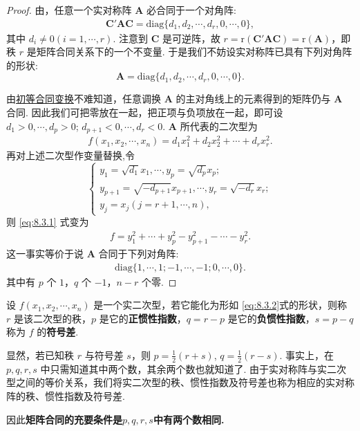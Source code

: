 \documentclass[../../main.tex]{subfiles}%
\begin{document}
\begin{proof}
由，任意一个实对称阵 $\boldsymbol{A}$ 必合同于一个对角阵:
\begin{align*}
\boldsymbol{C}'\boldsymbol{A}\boldsymbol{C}=\mathrm{diag}\{d_1,d_2,\cdots,d_r,0,\cdots,0\},
\end{align*}
其中 $d_i\neq 0 (i = 1,\cdots,r)$. 注意到 $\boldsymbol{C}$ 是可逆阵，故 $r = \mathrm{r}(\boldsymbol{C}'\boldsymbol{A}\boldsymbol{C})=\mathrm{r}(\boldsymbol{A})$，即秩 $r$ 是矩阵合同关系下的一个不变量. 于是我们不妨设实对称阵已具有下列对角阵的形状:
\[
\boldsymbol{A}=\mathrm{diag}\{d_1,d_2,\cdots,d_r,0,\cdots,0\}.
\]

由\hyperref[lemma:初等合同变换]{初等合同变换}不难知道，任意调换 $\boldsymbol{A}$ 的主对角线上的元素得到的矩阵仍与 $\boldsymbol{A}$ 合同. 因此我们可把零放在一起，把正项与负项放在一起，即可设 $d_1>0,\cdots,d_p>0$; $d_{p + 1}<0,\cdots,d_r<0$. $\boldsymbol{A}$ 所代表的二次型为
\begin{align}
f(x_1,x_2,\cdots,x_n)=d_1x_1^2 + d_2x_2^2 + \cdots + d_rx_r^2.\label{eq:8.3.1}
\end{align}
再对上述二次型作变量替换,令
\[
\begin{cases}
y_1 = \sqrt{d_1}x_1,\cdots,y_p = \sqrt{d_p}x_p;\\
y_{p + 1} = \sqrt{-d_{p + 1}}x_{p + 1},\cdots,y_r = \sqrt{-d_r}x_r;\\
y_j = x_j (j = r + 1,\cdots,n),
\end{cases}
\]
则 \eqref{eq:8.3.1} 式变为
\begin{align*}
f = y_1^2 + \cdots + y_p^2 - y_{p + 1}^2 - \cdots - y_r^2.
\end{align*}
这一事实等价于说 $\boldsymbol{A}$ 合同于下列对角阵:
\begin{align*}
\mathrm{diag}\{1,\cdots,1;-1,\cdots,-1;0,\cdots,0\}.
\end{align*}
其中有 $p$ 个 $1$，$q$ 个 $-1$，$n - r$ 个零. 
\end{proof}

\begin{definition}
设 $f(x_1,x_2,\cdots,x_n)$ 是一个实二次型，若它能化为形如 \eqref{eq:8.3.2}式的形状，则称 $r$ 是该二次型的秩，$p$ 是它的\textbf{正惯性指数}，$q = r - p$ 是它的\textbf{负惯性指数}，$s = p - q$ 称为 $f$ 的\textbf{符号差}.
\end{definition}
\begin{remark}
显然，若已知秩 $r$ 与符号差 $s$，则 $p = \frac{1}{2}(r + s)$, $q = \frac{1}{2}(r - s)$. 事实上，在 $p,q,r,s$ 中只需知道其中两个数，其余两个数也就知道了. 由于实对称阵与实二次型之间的等价关系，我们将实二次型的秩、惯性指数及符号差也称为相应的实对称阵的秩、惯性指数及符号差.

因此\textbf{矩阵合同的充要条件是$p,q,r,s$中有两个数相同.}
\end{remark}
\end{document}
